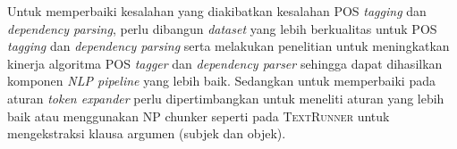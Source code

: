 Untuk memperbaiki kesalahan yang diakibatkan kesalahan POS \textit{tagging} dan \textit{dependency parsing}, perlu dibangun \textit{dataset} yang lebih berkualitas untuk POS \textit{tagging} dan \textit{dependency parsing} serta melakukan penelitian untuk meningkatkan kinerja algoritma POS \textit{tagger} dan \textit{dependency parser} sehingga dapat dihasilkan komponen \textit{NLP pipeline} yang lebih baik. Sedangkan untuk memperbaiki pada aturan \textit{token expander} perlu dipertimbangkan untuk meneliti aturan yang lebih baik atau menggunakan NP chunker seperti pada \textsc{TextRunner} \citep{banko2007open} untuk mengekstraksi klausa argumen (subjek dan objek). 
